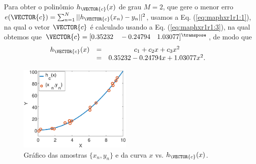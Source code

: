 \begin{SolutionT}\label{sol:theo:maphxr1r1}
Para obter o polinômio $h_{\VECTOR{c}}(x)$ de grau $M=2$, 
que gere o menor erro $e(\VECTOR{c}) =  \sum_{n=1}^{N} ||h_{\VECTOR{c}}(x_n)-y_n||^2$,
usamos a Eq. (\ref{eq:maphxr1r1:1}), 
na qual o vetor $\VECTOR{c}$ é calculado usando a Eq. (\ref{eq:maphxr1r1:3}),
na qual obtemos que $\VECTOR{c}=[0.35232\quad -0.24794\quad 1.03077]^{\transpose}$, de modo que
\begin{equation}
\begin{matrix}
h_{\VECTOR{c}}(x) & = & c_1+c_2 x+c_3 x^2 \\
                ~ & = & 0.35232 -0.24794 x + 1.03077 x^2.
\end{matrix}
\end{equation}
    \begin{figure}[!h]
        \centering
        \includegraphics[width=0.49\textwidth]{chapters/mapeamento/mfiles/mapeamentor1r1/minimizando_hx.eps}
        \caption{Gráfico das amostras $\{x_n,y_n\}$ e da curva $x$ vs. $h_{\VECTOR{c}}(x)$.}
        \label{fig:theo:maphxr1r1:xnyn}
    \end{figure}

\end{SolutionT}


